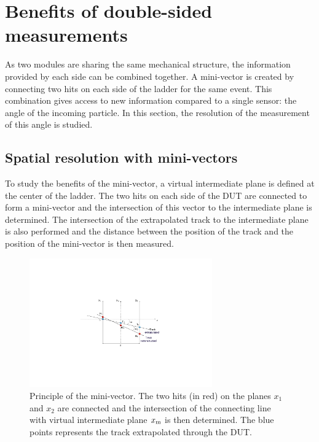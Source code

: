     
  \section{Benefits of double-sided measurements}
  
  As two modules are sharing the same mechanical structure, the information provided by each side can be combined together.
  A mini-vector is created by connecting two hits on each side of the ladder for the same event.
  This combination gives access to new information compared to a single sensor: the angle of the incoming particle.
  In this section, the resolution of the measurement of this angle is studied.

    \subsection{Spatial resolution with mini-vectors}

    To study the benefits of the mini-vector, a virtual intermediate plane is defined at the center of the ladder.
    The two hits on each side of the \gls{DUT} are connected to form a mini-vector and the intersection of this vector to the intermediate plane is determined.
    The intersection of the extrapolated track to the intermediate plane is also performed and the distance between the position of the track and the position of the mini-vector is then measured.

    \begin{figure}[!tbh]
      \centering
      \includegraphics[width=0.7\textwidth]{Pictures/deformation/mini_vectors.pdf}
      \caption{Principle of the mini-vector. The two hits (in red) on the planes $x_1$ and $x_2$ are connected and the intersection of the connecting line with virtual intermediate plane $x_{\rm{m}}$ is then determined. The blue points represents the track extrapolated through the DUT. }
      \label{fig:MV}
    \end{figure}

